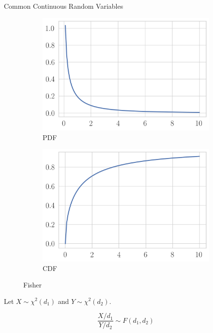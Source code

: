 \documentclass[11pt, xcolor={dvipsnames}, hyperref={colorlinks, allcolors=Blue}]{beamer}
\begin{document}
\begin{frame}{Common Continuous Random Variables}
\begin{figure}[t]
	\begin{subfigure}[b]{0.4\textwidth}
		\centering
		\includegraphics[width=\textwidth]{f_pdf.png}
		\caption*{PDF}
	\end{subfigure}
	\begin{subfigure}[b]{0.4\textwidth}
		\centering
		\includegraphics[width=\textwidth]{f_cdf.png}
		\caption*{CDF}
	\end{subfigure}
\caption{Fisher}
\end{figure}


Let $X \sim \chi^2(d_1)$ and $Y \sim \chi^2(d_2)$. 

\[ \frac{X/d_1}{Y/d_2} \sim F(d_1, d_2)\]


\end{frame}
\end{document}
